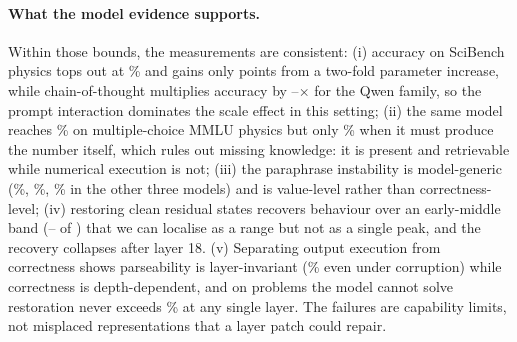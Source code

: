 \paragraph{What the model evidence supports.}
Within those bounds, the measurements are consistent: (i) accuracy on SciBench
physics tops out at \accCotFourteenB\% and gains only \gapFourteenVsSevenCot{}
points from a two-fold parameter increase, while chain-of-thought multiplies accuracy
by \ratioThreeB--\ratioFourteenB$\times$ for the Qwen family, so the prompt
interaction dominates the scale effect in this setting; (ii) the same model reaches
\accMMLU\% on multiple-choice MMLU physics but only \accCotSevenB\% when it must
produce the number itself, which rules out missing knowledge: it is present and
retrievable while numerical execution is not; (iii) the paraphrase instability is
model-generic (\pctChangedThreeBWording\%, \pctChangedFourteenBWording\%,
\pctChangedLlamaEightBWording\% in the other three models) and is value-level rather
than correctness-level; (iv) restoring clean residual states recovers behaviour over
an early-middle band (\plateauLo--\plateauHi{} of \nbLayers) that we can localise as
a range but not as a single peak, and the recovery collapses after
layer 18. (v) Separating output execution from correctness shows parseability is
layer-invariant (\pctParseCorrupt\% even under corruption) while correctness is
depth-dependent, and on problems the model cannot solve restoration never exceeds
\pctAccCleanWrongBest\% at any single layer. The failures are capability limits,
not misplaced representations that a layer patch could repair.

